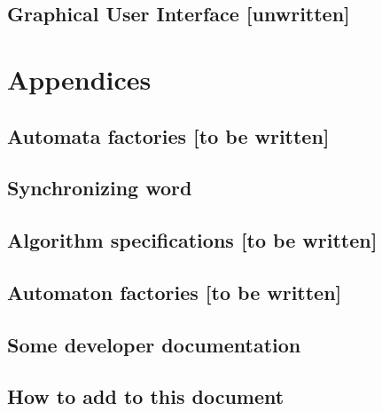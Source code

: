 \chapter{Graphical User Interface [unwritten]}

\part{Appendices}
\begin{appendices}
\chapter{Automata factories [to be written]}

\chapter{Synchronizing word}


\chapter{Algorithm specifications [to be written]}

\chapter{Automaton factories [to be written]}

\chapter{Some developer documentation}


\chapter{How to add to this document}


\end{appendices}


\backmatter

\cleardoublepage

%

\cleardoublepage
\printindex


